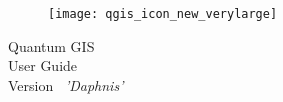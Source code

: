 
\begin{titlepage}
\begin{center}

\begin{figure}[H]
\begin{center}
\texttt{[image: qgis\_icon\_new\_verylarge]} 
\end{center}
\end{figure}

\Huge{Quantum GIS}\\
\vspace{0.5cm}
\Large{User Guide} \\
\vspace{0.5cm}
\Large{Version ~\CURRENT \textsl{'Daphnis'}}

\end{center}
\end{titlepage}
